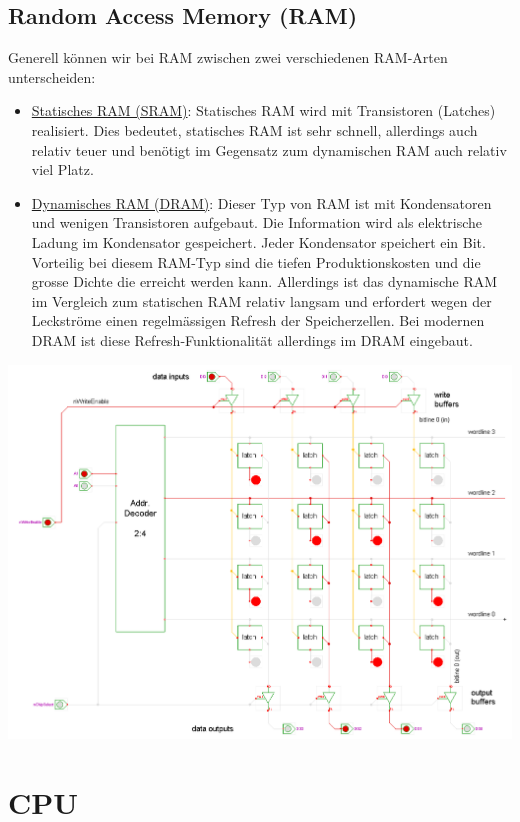 \documentclass{report}
\begin{document}
\subsection{Random Access Memory (RAM)}
Generell können wir bei RAM zwischen zwei verschiedenen RAM-Arten unterscheiden:
\begin{itemize}
\item \underline{Statisches RAM (SRAM)}: Statisches RAM wird mit Transistoren (Latches) realisiert. Dies bedeutet, statisches RAM ist sehr schnell, allerdings auch relativ teuer und benötigt im Gegensatz zum dynamischen RAM auch relativ viel Platz.
\item \underline{Dynamisches RAM (DRAM)}: Dieser Typ von RAM ist mit Kondensatoren und wenigen Transistoren aufgebaut. Die Information wird als elektrische Ladung im Kondensator gespeichert. Jeder Kondensator speichert ein Bit. Vorteilig bei diesem RAM-Typ sind die tiefen Produktionskosten und die grosse Dichte die erreicht werden kann. Allerdings ist das dynamische RAM im Vergleich zum statischen RAM relativ langsam und erfordert wegen der Leckströme einen regelmässigen Refresh der Speicherzellen. Bei modernen DRAM ist diese Refresh-Funktionalität allerdings im DRAM eingebaut.
\end{itemize}
\begin{center}\includegraphics[scale=0.2]{img/ram.png}\end{center}

\section{CPU}
\end{document}
